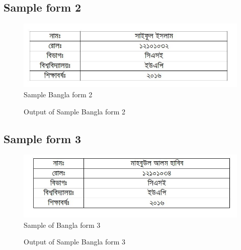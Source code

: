 \subsection{Sample form 2}
\begin{figure}[H]
\centering
\includegraphics[width=1\textwidth]{formBen02}
\caption {Sample Bangla form 2}
\label {fig:FormBan2}
\end{figure}
\begin{figure}[H]
\centering
{}
\caption {Output of Sample Bangla form 2}
\label {fig:FormBanOut2}
\end{figure}
\subsection{Sample form 3}
\begin{figure}[H]
\centering
\includegraphics[width=1\textwidth]{formBen03}
\caption {Sample of Bangla form 3}
\label {fig:FormBan3}
\end{figure}
\begin{figure}[H]
\centering
{}
\caption {Output of Sample Bangla form 3}
\label {fig:FormBanOut3}
\end{figure}
